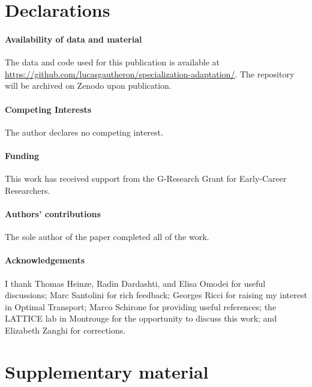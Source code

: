 \documentclass{article}
\begin{document}

\printglossaries

\section*{Declarations}

\paragraph{Availability of data and material}{The data and code used for this publication is available at \url{https://github.com/lucasgautheron/specialization-adaptation/}. The repository will be archived on Zenodo upon publication.}

\paragraph{Competing Interests}{The author declares no competing interest.}

\paragraph{Funding}{This work has received support from the G-Research Grant for Early-Career Researchers.}

\paragraph{Authors' contributions}{The sole author of the paper completed all of the work.}

\paragraph{Acknowledgements}{I thank Thomas Heinze, Radin Dardashti, and Elisa Omodei for useful discussions; Marc Santolini for rich feedback; Georges Ricci for raising my interest in Optimal Transport; Marco Schirone for providing useful references; the LATTICE lab in Montrouge for the opportunity to discuss this work; and Elizabeth Zanghi for corrections.}



\printbibliography

\newpage

\appendix

\section{Supplementary material}
\end{document}

